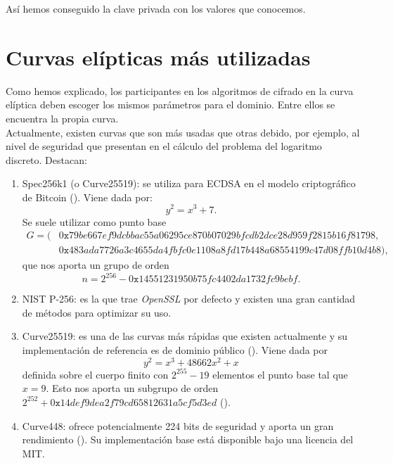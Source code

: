 \documentclass[11pt]{article}
\begin{document}
Así hemos conseguido la clave privada con los valores que conocemos.

\section{Curvas elípticas más utilizadas}
\label{sec:cur_usa}

Como hemos explicado, los participantes en los algoritmos de cifrado en la curva elíptica deben escoger los mismos parámetros para el dominio. Entre ellos se encuentra la propia curva.\\

Actualmente, existen curvas que son más usadas que otras debido, por ejemplo, al nivel de seguridad que presentan en el cálculo del problema del logaritmo discreto. Destacan:
\begin{enumerate}
\item Spec256k1 (o Curve25519): se utiliza para ECDSA en el modelo criptográfico de Bitcoin (\cite{Secp256k1}). Viene dada por:
\[
y^2 = x^3 + 7.
\]
Se suele utilizar como punto base
\begin{equation*}
\begin{split}
G = (&0\texttt{x}79be667ef9dcbbac55a06295ce870b07029bfcdb2dce28d959f2815b16f81798, \\
		&0\texttt{x}483ada7726a3c4655da4fbfc0e1108a8fd17b448a68554199c47d08ffb10d4b8),
\end{split}
\end{equation*}
que nos aporta un grupo de orden
\[
n =2^{256}-0\texttt{x}14551231950b75fc4402da1732fc9bebf.
\]

\item NIST P-256: es la que trae \textit{OpenSSL} por defecto y existen una gran cantidad de métodos para optimizar su uso. \\

\item Curve25519: es una de las curvas más rápidas que existen actualmente y su implementación de referencia es de dominio público (\cite{langley_elliptic_nodate}). Viene dada por
\[
y^2 = x^3 + 48662x^2 + x
\]
definida sobre el cuerpo finito con $ 2^{255} - 19 $ elementos el punto base tal que $ x = 9 $. Esto nos aporta un subgrupo de orden $ 2^{252 }+ 0\texttt{x}14def9dea2f79cd65812631a5cf5d3ed $ (\cite{curve25519}). \\

\item  Curve448: ofrece potencialmente 224 bits de seguridad y aporta un gran rendimiento (\cite{curve448}). Su implementación base está disponible bajo una licencia del MIT. \\
\end{enumerate}
\end{document}
